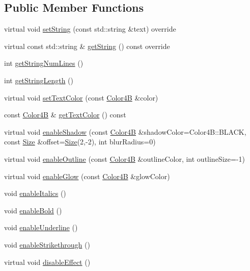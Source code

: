 \subsection*{Public Member Functions}
\begin{DoxyCompactItemize}
\item 
virtual void \hyperlink{classLabel_a01631cdec4595921e78fb085a88118d9}{set\+String} (const std\+::string \&text) override
\item 
virtual const std\+::string \& \hyperlink{classLabel_ab306634d58f4317fd96008a5ee67a7a7}{get\+String} () const override
\item 
int \hyperlink{classLabel_ab412a9bf4034e5ac27293fe9b44b654a}{get\+String\+Num\+Lines} ()
\item 
int \hyperlink{classLabel_ae21ab9e381ac4c9589c31401843e5ca2}{get\+String\+Length} ()
\item 
virtual void \hyperlink{classLabel_a692d2efd4b152b36df5cfcfbd9ee856d}{set\+Text\+Color} (const \hyperlink{structColor4B}{Color4B} \&color)
\item 
const \hyperlink{structColor4B}{Color4B} \& \hyperlink{classLabel_adb4e491a31a5c09c9ceb23a41797148a}{get\+Text\+Color} () const
\item 
virtual void \hyperlink{classLabel_a274a555bb2bd7b10d36a9de5ee361399}{enable\+Shadow} (const \hyperlink{structColor4B}{Color4B} \&shadow\+Color=Color4\+B\+::\+B\+L\+A\+CK, const \hyperlink{classSize}{Size} \&offset=\hyperlink{classSize}{Size}(2,-\/2), int blur\+Radius=0)
\item 
virtual void \hyperlink{classLabel_a7a018cd2ee48a60de9ed8983938573d8}{enable\+Outline} (const \hyperlink{structColor4B}{Color4B} \&outline\+Color, int outline\+Size=-\/1)
\item 
virtual void \hyperlink{classLabel_ab3132d1aef749205dae873f44536324d}{enable\+Glow} (const \hyperlink{structColor4B}{Color4B} \&glow\+Color)
\item 
void \hyperlink{classLabel_a95ad191f37a92e4a72013cd4183726fe}{enable\+Italics} ()
\item 
void \hyperlink{classLabel_a2b89abd6d8c0d225e9271e0a7f46b315}{enable\+Bold} ()
\item 
void \hyperlink{classLabel_af8dd37db2a2bf06ef6114ddbcb77845d}{enable\+Underline} ()
\item 
void \hyperlink{classLabel_accb5df5cb55d97d516d90489aafff1fb}{enable\+Strikethrough} ()
\item 
virtual void \hyperlink{classLabel_ab08e401bb16ce05fff21a0ef45a53203}{disable\+Effect} ()

\end{DoxyCompactItemize}
